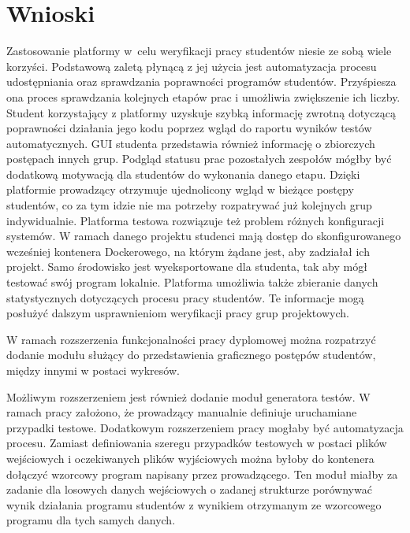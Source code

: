 \chapter{Wnioski}
\label{chapter:conclusion}

Zastosowanie platformy w~celu weryfikacji pracy studentów niesie ze sobą wiele korzyści.
Podstawową zaletą płynącą z jej użycia jest automatyzacja procesu udostępniania oraz sprawdzania poprawności programów studentów.
Przyśpiesza ona proces sprawdzania kolejnych etapów prac i umożliwia zwiększenie ich liczby.
Student korzystający z platformy uzyskuje szybką informację zwrotną dotyczącą poprawności działania jego kodu poprzez wgląd do raportu wyników testów automatycznych.
GUI studenta przedstawia również informację o zbiorczych postępach innych grup.
Podgląd statusu prac pozostałych zespołów mógłby być dodatkową motywacją dla studentów do wykonania danego etapu.
Dzięki platformie prowadzący otrzymuje ujednolicony wgląd w bieżące postępy studentów, co za tym idzie nie ma potrzeby rozpatrywać już kolejnych grup indywidualnie.
Platforma testowa rozwiązuje też problem różnych konfiguracji systemów.
W ramach danego projektu studenci mają dostęp do skonfigurowanego wcześniej kontenera Dockerowego, na którym żądane jest, aby zadziałał ich projekt.
Samo środowisko jest wyeksportowane dla studenta, tak aby mógł testować swój program lokalnie.
Platforma umożliwia także zbieranie danych statystycznych dotyczących procesu pracy studentów.
Te informacje mogą posłużyć dalszym usprawnieniom weryfikacji pracy grup projektowych.

W ramach rozszerzenia funkcjonalności pracy dyplomowej można rozpatrzyć dodanie modułu służący do przedstawienia graficznego postępów studentów, między innymi w postaci wykresów.

Możliwym rozszerzeniem jest również dodanie moduł generatora testów.
W ramach pracy założono, że prowadzący manualnie definiuje uruchamiane przypadki testowe.
Dodatkowym rozszerzeniem pracy mogłaby być automatyzacja procesu.
Zamiast definiowania szeregu przypadków testowych w postaci plików wejściowych i oczekiwanych plików wyjściowych można byłoby do kontenera dołączyć wzorcowy program napisany przez prowadzącego.
Ten moduł miałby za zadanie dla losowych danych wejściowych o zadanej strukturze porównywać wynik działania programu studentów z wynikiem otrzymanym ze wzorcowego programu dla tych samych danych.
